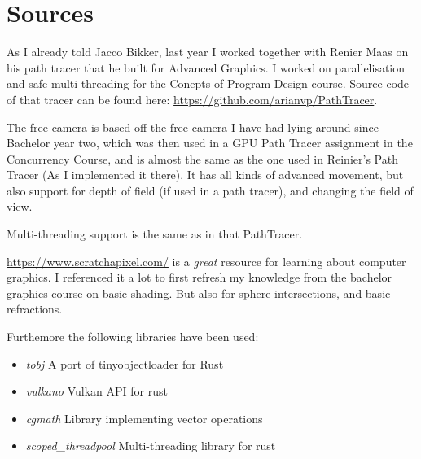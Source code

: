 \documentclass{article}
\begin{document}
\section{Sources}
As I already told Jacco Bikker, last year I worked together with Renier Maas on his path tracer that he built
for Advanced Graphics. I worked  on parallelisation and safe multi-threading for the Conepts of Program Design course.
Source code of that tracer can be found here: \url{https://github.com/arianvp/PathTracer}.

The free camera is based off the free camera I have had lying around since
Bachelor year two, which was then used in a GPU Path Tracer assignment in the
Concurrency Course, and is almost the same as the one used in Reinier's Path
Tracer (As I implemented it there). It has all kinds of advanced movement, but
also support for depth of field (if used in a path tracer), and changing the
field of view.

Multi-threading support is the same as in that PathTracer.

\url{https://www.scratchapixel.com/} is a \emph{great} resource for learning about computer graphics.
I referenced it a lot to first refresh my knowledge from the bachelor graphics course on basic shading.
But also for sphere intersections, and basic refractions.

Furthemore the following libraries have been used:
\begin{itemize}
  \item \emph{tobj} A port of tinyobjectloader for Rust
  \item \emph{vulkano} Vulkan API for rust
  \item \emph{cgmath} Library implementing vector operations
  \item \emph{scoped\_threadpool} Multi-threading library for rust
\end{itemize}
\end{document}
